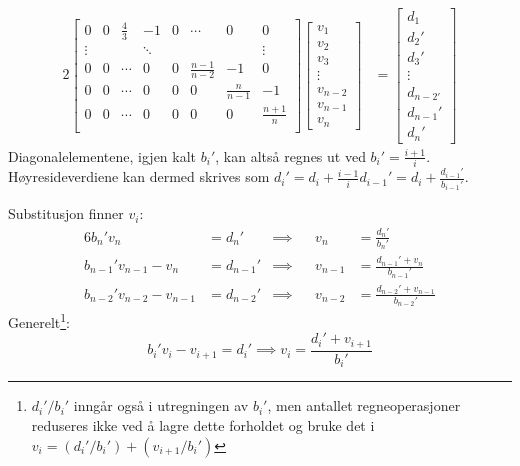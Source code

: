 \documentclass[12pt,norsk,a4paper]{report}
\begin{document}
\begin{alignat*}{2}
\begin{bmatrix}
0 & 0 & \frac{4}{3} & -1 & 0 & \cdots & 0 & 0\\
\vdots & & & \ddots & & & & \vdots\\
0 & 0 & \cdots & 0 & 0 & \frac{n-1}{n-2} & -1 & 0\\
0 & 0 & \cdots & 0 & 0 & 0 & \frac{n}{n-1} & -1\\
0 & 0 & \cdots & 0 & 0 & 0 & 0 & \frac{n+1}{n}\\
\end{bmatrix}
\begin{bmatrix}
v_1\\
v_2\\
v_3\\
\vdots\\
v_{n-2}\\
v_{n-1}\\
v_n
\end{bmatrix}
&=
\begin{bmatrix}
d_1\\
d_2'\\
d_3'\\
\vdots\\
d_{n-2'}\\
d_{n-1}'\\
d_n'
\end{bmatrix}
\end{alignat*}
Diagonalelementene, igjen kalt \(b_i'\), kan altså regnes ut ved \(b_i'=\frac{i+1}{i}\). Høyresideverdiene kan dermed skrives som \(d_i' = d_i + \frac{i-1}{i}d_{i-1}'=d_i+\frac{d_{i-1}'}{b_{i-1}'}\).

Substitusjon finner \(v_i\):
\begin{alignat*}{6}
b_n'v_n&=d_n' &\implies&& v_n&=\frac{d_n'}{b_n'}\\
b_{n-1}'v_{n-1}-v_n&=d_{n-1}' &\implies&& v_{n-1} &= \frac{d_{n-1}'+v_n}{b_{n-1}'}\\
b_{n-2}'v_{n-2}-v_{n-1}&=d_{n-2}' &\implies&& v_{n-2} &= \frac{d_{n-2}'+v_{n-1}}{b_{n-2}'}
\end{alignat*}
Generelt\footnote{\(d_i'/b_i'\) inngår også i utregningen av \(b_i'\), men antallet regneoperasjoner reduseres ikke ved å lagre dette forholdet og bruke det i \(v_i=(d_i'/b_i')+(v_{i+1}/b_i')\)}:
\[
b_{i}'v_{i}-v_{i+1}=d_{i}' \implies v_{i} = \frac{d_{i}'+v_{i+1}}{b_{i}'}
\]
\end{document}
